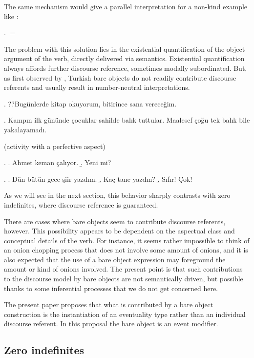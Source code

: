 \documentclass[11pt,a4paper]{article}
\begin{document}
The same mechanism would give a parallel interpretation for a non-kind example like :

\ex.
 $=$ 


The problem with this solution lies in the existential quantification of the object argument of the verb, directly delivered via semantics. Existential quantification always affords further discourse reference, sometimes modally subordinated. But, as first observed by , Turkish bare objects do not readily contribute discourse referents and usually result in number-neutral interpretations.

\ex. ??Bugünlerde kitap okuyorum, bitirince sana vereceğim.

\ex. Kampın ilk gününde çocuklar sahilde balık tuttular. Maalesef çoğu tek balık bile yakalayamadı.

(activity with a perfective aspect)


\ex. \a. Ahmet keman çalıyor.
\b.  Yeni mi?


\ex. \a. Dün bütün gece şiir yazdım.
\b. Kaç tane yazdın?
\b. Sıfır! Çok!

As we will see in the next section, this behavior sharply contrasts with zero indefinites, where discourse reference is guaranteed.

There are cases where bare objects seem to contribute discourse referents, however. This possibility appears to be dependent on the aspectual class and conceptual details of the verb. For instance, it seems rather impossible to think of an onion chopping process that does not involve some amount of onions, and it is also expected that the use of a bare object expression may foreground the amount or kind of onions involved. 
The present point is that such contributions to the discourse model by bare objects are not semantically driven, but possible thanks to some inferential processes that we do not get concerned here.

The present paper proposes that what is contributed by a bare object construction is the instantiation of an eventuality type rather than an individual discourse referent. In this proposal the bare object is an event modifier.




\subsection{Zero indefinites}
\end{document}
